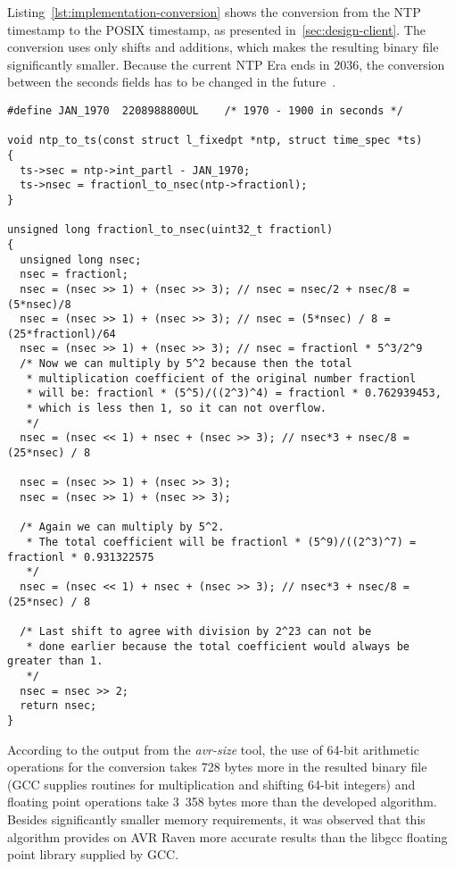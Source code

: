 Listing~\ref{lst:implementation-conversion} shows the conversion from the NTP timestamp to the POSIX timestamp,
as presented in~\ref{sec:design-client}.
The conversion uses only shifts and additions, which makes the resulting binary file
significantly smaller.
Because the current NTP Era ends in 2036,
the conversion between the seconds fields has to be changed in the future~\cite{ntp-y2k}.
\begin{lstlisting}[caption={Conversion from NTP timestamp to POSIX timestamp},label={lst:implementation-conversion}]
#define	JAN_1970  2208988800UL    /* 1970 - 1900 in seconds */

void ntp_to_ts(const struct l_fixedpt *ntp, struct time_spec *ts)
{
  ts->sec = ntp->int_partl - JAN_1970;
  ts->nsec = fractionl_to_nsec(ntp->fractionl);
}

unsigned long fractionl_to_nsec(uint32_t fractionl)
{
  unsigned long nsec;
  nsec = fractionl;
  nsec = (nsec >> 1) + (nsec >> 3); // nsec = nsec/2 + nsec/8 = (5*nsec)/8
  nsec = (nsec >> 1) + (nsec >> 3); // nsec = (5*nsec) / 8 = (25*fractionl)/64
  nsec = (nsec >> 1) + (nsec >> 3); // nsec = fractionl * 5^3/2^9
  /* Now we can multiply by 5^2 because then the total
   * multiplication coefficient of the original number fractionl
   * will be: fractionl * (5^5)/((2^3)^4) = fractionl * 0.762939453,
   * which is less then 1, so it can not overflow.
   */
  nsec = (nsec << 1) + nsec + (nsec >> 3); // nsec*3 + nsec/8 = (25*nsec) / 8

  nsec = (nsec >> 1) + (nsec >> 3);
  nsec = (nsec >> 1) + (nsec >> 3);

  /* Again we can multiply by 5^2.
   * The total coefficient will be fractionl * (5^9)/((2^3)^7) = fractionl * 0.931322575
   */
  nsec = (nsec << 1) + nsec + (nsec >> 3); // nsec*3 + nsec/8 = (25*nsec) / 8

  /* Last shift to agree with division by 2^23 can not be
   * done earlier because the total coefficient would always be greater than 1.
   */
  nsec = nsec >> 2;
  return nsec;
}
\end{lstlisting}
According to the output from the {\it{avr-size}} tool,
the use of 64-bit arithmetic operations for the conversion
takes 728 bytes more in the
resulted binary file (GCC supplies routines for multiplication and shifting 64-bit integers)
and floating point operations take 3~358 bytes more
than the developed algorithm.
Besides significantly smaller memory requirements,
it was observed that this algorithm provides on AVR Raven
more accurate results than the libgcc floating point library supplied by GCC.
